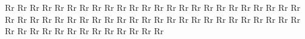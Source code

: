 \documentclass{worksheet}
\begin{document}
\begin{drillsheet}
\calligra
Rr Rr Rr Rr Rr Rr Rr Rr Rr Rr Rr Rr Rr Rr Rr Rr Rr Rr Rr Rr Rr Rr Rr Rr Rr Rr Rr Rr Rr Rr Rr Rr Rr Rr Rr Rr Rr Rr Rr Rr Rr Rr Rr Rr Rr Rr Rr Rr Rr Rr Rr Rr Rr Rr Rr Rr Rr Rr Rr Rr Rr
\end{drillsheet}
\end{document}
